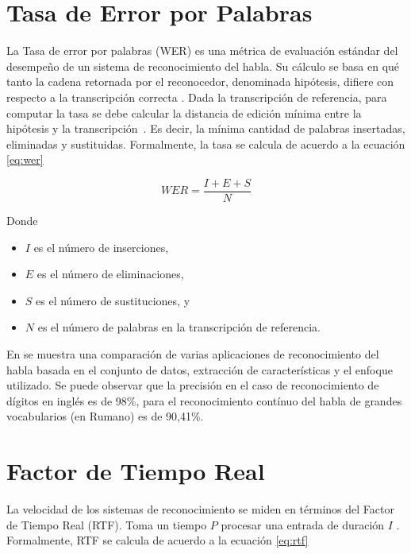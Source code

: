 \section{Tasa de Error por Palabras}
\label{sec:wer}

La Tasa de error por palabras (WER) es una m\'etrica de evaluaci\'on est\'andar del desempe\~no de un sistema de
reconocimiento del habla. Su c\'alculo se basa en qu\'e tanto la cadena retornada por el reconocedor,
denominada hip\'otesis, difiere con respecto a la transcripci\'on correcta \cite{Jurafsky}. 
Dada la transcripci\'on de referencia, para computar la tasa se debe calcular la distancia de edici\'on m\'inima
entre la hip\'otesis y la \mbox{transcripci\'on \cite{GaikwadAReview2010}}. Es decir, la m\'inima cantidad de palabras insertadas, eliminadas y
sustituidas. Formalmente, la tasa se calcula de acuerdo a la ecuaci\'on \eqref{eq:wer}

\begin{equation}
\label{eq:wer}
    WER = \frac{I + E + S}{N} 
\end{equation}

Donde

\begin{itemize}
    \item $I$ es el n\'umero de inserciones,
    \item $E$ es el n\'umero de eliminaciones,
    \item $S$ es el n\'umero de sustituciones, y
    \item $N$ es el n\'umero de palabras en la transcripci\'on de referencia.
\end{itemize}

En \cite{VimalaReview2012} se muestra una comparaci\'on de varias aplicaciones de reconocimiento del habla basada
en el conjunto de datos, extracci\'on de caracter\'isticas y el enfoque utilizado. Se puede observar que la precisi\'on
en el caso de reconocimiento de d\'igitos en ingl\'es es de 98\%, para el reconocimiento cont\'inuo del habla
de grandes vocabularios (en Rumano) es de 90,41\%.

\section{Factor de Tiempo Real}
\label{sec:rtf}

La velocidad de los sistemas de reconocimiento se miden en t\'erminos del Factor de Tiempo Real (RTF). Toma un tiempo $P$
procesar una entrada de duraci\'on $I$ \cite{VimalaReview2012}. Formalmente, RTF se calcula de acuerdo a la ecuaci\'on \eqref{eq:rtf}

